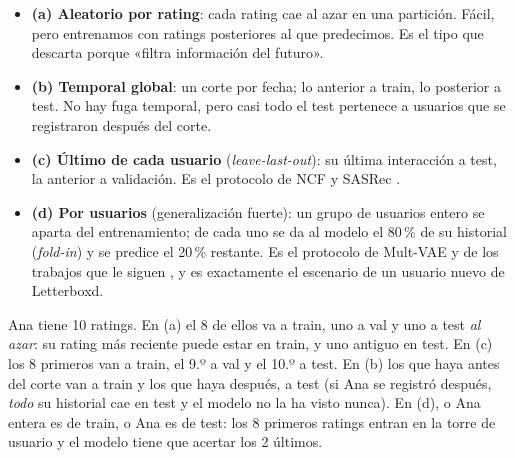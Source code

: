 \documentclass[a4paper,11pt]{article}
\begin{document}
\begin{itemize}
  \item \textbf{(a) Aleatorio por rating}: cada rating cae al azar en una partición. Fácil, pero entrenamos con ratings
        posteriores al que predecimos. Es el tipo que \cite{covington2016} descarta porque «filtra información del futuro».
  \item \textbf{(b) Temporal global}: un corte por fecha; lo anterior a train, lo posterior a test. No hay fuga
        temporal, pero casi todo el test pertenece a usuarios que se registraron después del corte.
  \item \textbf{(c) Último de cada usuario} (\emph{leave-last-out}): su última interacción a test, la anterior a
        validación. Es el protocolo de NCF y SASRec \cite{he2017,kang2018}.
  \item \textbf{(d) Por usuarios} (generalización fuerte): un grupo de usuarios entero se aparta del entrenamiento; de
        cada uno se da al modelo el 80\,\% de su historial (\emph{fold-in}) y se predice el 20\,\% restante. Es el
        protocolo de Mult-VAE y de los trabajos que le siguen \cite{liang2018,steck2019}, y es exactamente el
        escenario de un usuario nuevo de Letterboxd.
\end{itemize}

\begin{ejemplo}
Ana tiene 10 ratings. En (a) el 8 de ellos va a train, uno a val y uno a test \emph{al azar}: su rating más reciente
puede estar en train, y uno antiguo en test. En (c) los 8 primeros van a train, el 9.º a val y el 10.º a test. En (b) los
que haya antes del corte van a train y los que haya después, a test (si Ana se registró después, \emph{todo} su historial
cae en test y el modelo no la ha visto nunca). En (d), o Ana entera es de train, o Ana es de test: los 8 primeros ratings
entran en la torre de usuario y el modelo tiene que acertar los 2 últimos.
\end{ejemplo}
\end{document}
